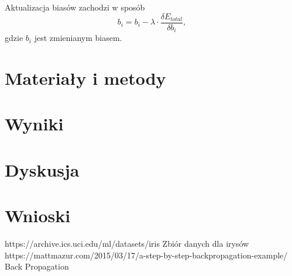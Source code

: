 \documentclass{classrep}
\begin{document}
Aktualizacja biasów zachodzi w sposób
\begin{equation} \label{eq:generalBackPropagationBias}
	b_i = b_i - \lambda \cdot \frac{\delta E_{total}}{\delta b_i},
\end{equation}
gdzie $b_i$ jest zmienianym biasem.

\section{Materiały i metody}

\section{Wyniki}
			

\section{Dyskusja}

\section{Wnioski}


\begin{thebibliography}{0}
https://archive.ics.uci.edu/ml/datasets/iris
Zbiór danych dla irysów
https://mattmazur.com/2015/03/17/a-step-by-step-backpropagation-example/
Back Propagation
\end{thebibliography}
\end{document}
